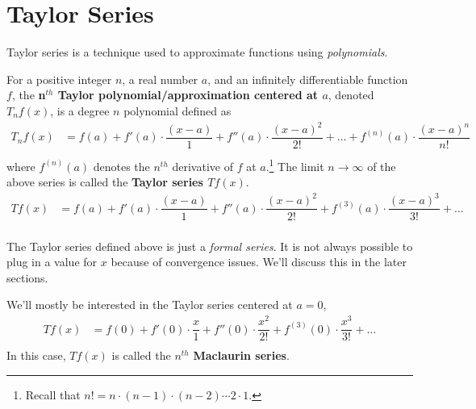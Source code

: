 
\section{Taylor Series}
Taylor series is a technique used to approximate functions using {\it polynomials}.

\begin{definition}
  \label{def:Taylor_series}
For a positive integer $n$, a real number $a$, and an infinitely differentiable function $f$, the {\bf n$^{th}$ Taylor polynomial/approximation centered at $a$}, denoted $T_nf (x)$, is a degree $n$ polynomial defined as\\
  \begin{align*}
    T_nf (x) &= f(a)
    + f'(a) \cdot \dfrac{(x-a)}{1}
    + f''(a) \cdot \dfrac{(x-a)^2}{2!}
    + \dots
    + f^{(n)}(a) \cdot \dfrac{(x-a)^n}{n!}\\
  \end{align*}
  where $f^{(n)}(a)$ denotes the $n^{th}$ derivative of $f$ at $a$.\footnote{Recall that $n! = n \cdot (n-1) \cdot (n-2) \cdots 2 \cdot 1 $.}
The limit $n \rightarrow \infty$ of the above series is called the {\bf Taylor series $Tf(x)$}.\\
\begin{align*}
  Tf(x) &= f(a)
  + f'(a) \cdot \dfrac{(x-a)}{1}
  + f''(a) \cdot \dfrac{(x-a)^2}{2!}
  + f^{(3)}(a) \cdot \dfrac{(x-a)^3}{3!}
  + \dots\\
\end{align*}
\end{definition}

\begin{remark}
  The Taylor series defined above is just a {\it formal series}.
  It is not always possible to plug in a value for $x$ because of convergence issues.
  We'll discuss this in the later sections.
\end{remark}

We'll mostly be interested in the Taylor series centered at $a = 0$, \\
\begin{align*}
  Tf(x)
  &=
  f(0)
  + f'(0) \cdot \dfrac{x}{1}
  + f''(0) \cdot \dfrac{x^2}{2!}
  + f^{(3)}(0) \cdot \dfrac{x^3}{3!}
  + \dots\\
\end{align*}
In this case, $Tf(x)$ is called the $n^{th}$ {\bf Maclaurin series}.



